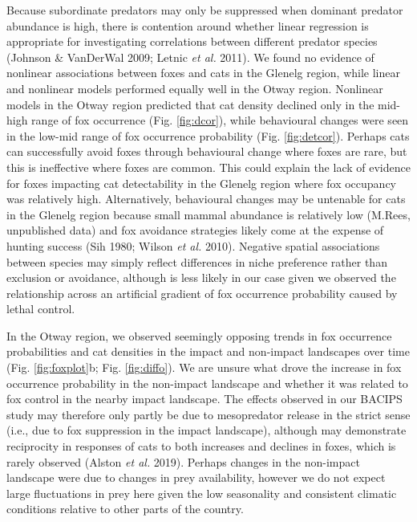 \documentclass[preprint, 3p, authoryear]{elsarticle} %
\begin{document}
Because subordinate predators may only be suppressed when dominant predator abundance is high, there is contention around whether linear regression is appropriate for investigating correlations between different predator species (Johnson \& VanDerWal 2009; Letnic \emph{et al.} 2011). We found no evidence of nonlinear associations between foxes and cats in the Glenelg region, while linear and nonlinear models performed equally well in the Otway region. Nonlinear models in the Otway region predicted that cat density declined only in the mid-high range of fox occurrence (Fig. \ref{fig:dcor}), while behavioural changes were seen in the low-mid range of fox occurrence probability (Fig. \ref{fig:detcor}). Perhaps cats can successfully avoid foxes through behavioural change where foxes are rare, but this is ineffective where foxes are common. This could explain the lack of evidence for foxes impacting cat detectability in the Glenelg region where fox occupancy was relatively high. Alternatively, behavioural changes may be untenable for cats in the Glenelg region because small mammal abundance is relatively low (M.Rees, unpublished data) and fox avoidance strategies likely come at the expense of hunting success (Sih 1980; Wilson \emph{et al.} 2010). Negative spatial associations between species may simply reflect differences in niche preference rather than exclusion or avoidance, although is less likely in our case given we observed the relationship across an artificial gradient of fox occurrence probability caused by lethal control.

In the Otway region, we observed seemingly opposing trends in fox occurrence probabilities and cat densities in the impact and non-impact landscapes over time (Fig. \ref{fig:foxplot}b; Fig. \ref{fig:diffo}). We are unsure what drove the increase in fox occurrence probability in the non-impact landscape and whether it was related to fox control in the nearby impact landscape. The effects observed in our BACIPS study may therefore only partly be due to mesopredator release in the strict sense (i.e., due to fox suppression in the impact landscape), although may demonstrate reciprocity in responses of cats to both increases and declines in foxes, which is rarely observed (Alston \emph{et al.} 2019). Perhaps changes in the non-impact landscape were due to changes in prey availability, however we do not expect large fluctuations in prey here given the low seasonality and consistent climatic conditions relative to other parts of the country.
\end{document}
